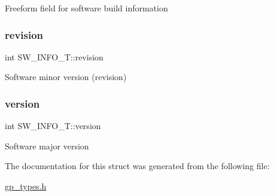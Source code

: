Freeform field for software build information \mbox{\label{structSW__INFO__T_a69e2b84a5a4a96f0941802115b937a3b}} 
\subsubsection{\texorpdfstring{revision}{revision}}
{\footnotesize\ttfamily int S\+W\+\_\+\+I\+N\+F\+O\+\_\+\+T\+::revision}

Software minor version (revision) \mbox{\label{structSW__INFO__T_a4de1b448e07d278eed52eaabb1a4946b}} 
\subsubsection{\texorpdfstring{version}{version}}
{\footnotesize\ttfamily int S\+W\+\_\+\+I\+N\+F\+O\+\_\+\+T\+::version}

Software major version 

The documentation for this struct was generated from the following file\+:\begin{DoxyCompactItemize}
\item 
\mbox{\hyperlink{gp__types_8h}{gp\+\_\+types.\+h}}\end{DoxyCompactItemize}
